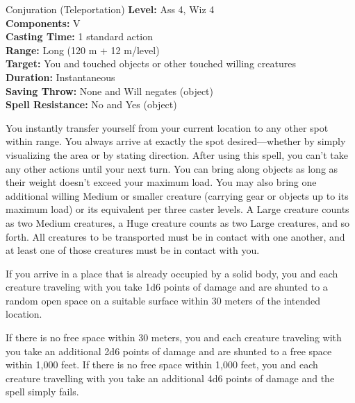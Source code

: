 {Conjuration (Teleportation)}
{
	\textbf{Level:}
	Ass 4, Wiz 4\\
	\textbf{Components:}
	V\\
	\textbf{Casting Time:}
	1 standard action\\
	\textbf{Range:}
	Long (120 m + 12 m/level)\\
	\textbf{Target:}
	You and touched objects or other touched willing creatures\\
	\textbf{Duration:}
	Instantaneous\\
	\textbf{Saving Throw:}
	None and Will negates (object)\\
	\textbf{Spell Resistance:}
	No and Yes (object)\\
}
{
	You instantly transfer yourself from your current location to any other spot within range. You always arrive at exactly the spot desired---whether by simply visualizing the area or by stating direction. After using this spell, you can't take any other actions until your next turn. You can bring along objects as long as their weight doesn't exceed your maximum load. You may also bring one additional willing Medium or smaller creature (carrying gear or objects up to its maximum load) or its equivalent per three caster levels. A Large creature counts as two Medium creatures, a Huge creature counts as two Large creatures, and so forth. All creatures to be transported must be in contact with one another, and at least one of those creatures must be in contact with you.

	If you arrive in a place that is already occupied by a solid body, you and each creature traveling with you take 1d6 points of damage and are shunted to a random open space on a suitable surface within 30 meters of the intended location.

	If there is no free space within 30 meters, you and each creature traveling with you take an additional 2d6 points of damage and are shunted to a free space within 1,000 feet. If there is no free space within 1,000 feet, you and each creature travelling with you take an additional 4d6 points of damage and the spell simply fails.

}
